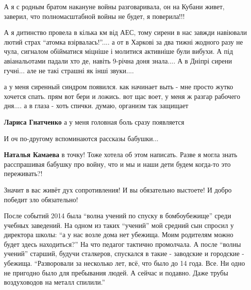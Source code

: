 \begin{itemize}
\begin{itemize}
\end{itemize} %


А я с родным братом накануне войны разговаривала, он на Кубани живет, заверил,
что полномасштабной войны не будет, я поверила!!!


А я дитинство провела в кілька км від АЕС, тому сирени в нас завжди навіювали
лютий страх \enquote{атомка взірвалась!}.... а от в Харкові за два тижні жодного разу
не чула, сигналом обійматися міцніше і молитися активніше були вибухи. А під
авіанальотами падали хто де, навіть 9-річна доня знала.... А в Дніпрі сирени
гучні... але не такі страшні як інші звуки....


а у меня сиренный синдром появился. как начинает выть - мне просто жутко
хочется спать. прям вот бери и ложись. вот щас воет, у меня ж разгар рабочего
дня.... а в глаза - хоть спички. думаю, организм так защищает

\textbf{Лариса Гнатченко} а у меня головная боль сразу появляется

И оч по-другому вспоминаются рассказы бабушки...

\begin{itemize} %
\textbf{Наталья Камаева} в точку! Тоже хотела об этом написать. Разве я могла знать расспрашивая бабушку про войну, что и мы и наши дети будем когда-то это переживать?!
\end{itemize} %


Значит в вас живёт дух сопротивления! И вы обязательно выстоете! И добро
победит зло обязательно!


После событий 2014 была \enquote{волна учений по спуску в бомбоубежище} среди учебных
заведений. На одном из таких \enquote{учений} мой средний сын спросил у директора
школы: \enquote{а у нас возле дома нет убежища. Моим родителям можно будет здесь
находиться?} На что педагог тактично промолчала. А после \enquote{волны учений}
старший, будучи сталкеров, спускался в такие - заводские и городские - убежища.
\enquote{Разворовали за несколько лет, всё, что было до 14 года. Все. Ни одно не
пригодно было для пребывания людей. А сейчас и подавно. Даже трубы воздуховодов
на металл спилили.}


\end{itemize}
